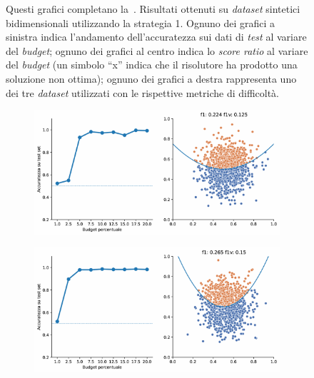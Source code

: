 \begin{appendices}
\begin{figure}[ht]
\begin{subfigure}{.8\textwidth}
    \end{subfigure}%
    \caption[]{Questi grafici completano la~. Risultati ottenuti su \emph{dataset} sintetici bidimensionali utilizzando la strategia 1. Ognuno dei grafici a sinistra indica l'andamento dell'accuratezza sui dati di \emph{test} al variare del \emph{budget}; ognuno dei grafici al centro indica lo \emph{score ratio} al variare del \emph{budget} (un simbolo ``x'' indica che il risolutore ha prodotto una soluzione non ottima); ognuno dei grafici a destra rappresenta uno dei tre \emph{dataset} utilizzati con le rispettive metriche di difficoltà.}
\end{figure}

\begin{figure}[b!]
    \centering
    \begin{subfigure}{.8\textwidth}
        \centering
        \includegraphics[width=\textwidth]{img/2d_v2/1.pdf}
    \end{subfigure}%
    \hfill
    \begin{subfigure}{.8\textwidth}
        \centering
        \includegraphics[width=\textwidth]{img/2d_v2/2.pdf}
    \end{subfigure}
    \hfill
    \begin{subfigure}{.8\textwidth}

\end{subfigure}
\end{figure}
\end{appendices}
